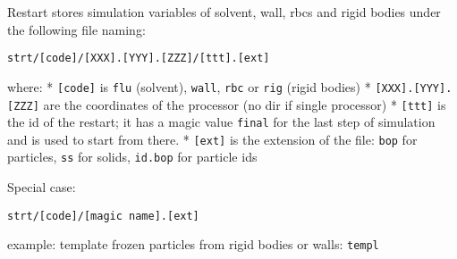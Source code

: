 Restart stores simulation variables of solvent, wall, rbcs and rigid
bodies under the following file naming:

\begin{verbatim}
strt/[code]/[XXX].[YYY].[ZZZ]/[ttt].[ext]
\end{verbatim}

where: * \texttt{{[}code{]}} is \texttt{flu} (solvent), \texttt{wall},
\texttt{rbc} or \texttt{rig} (rigid bodies) *
\texttt{{[}XXX{]}.{[}YYY{]}.{[}ZZZ{]}} are the coordinates of the
processor (no dir if single processor) * \texttt{{[}ttt{]}} is the id of
the restart; it has a magic value \texttt{final} for the last step of
simulation and is used to start from there. * \texttt{{[}ext{]}} is the
extension of the file: \texttt{bop} for particles, \texttt{ss} for
solids, \texttt{id.bop} for particle ids

Special case:

\begin{verbatim}
strt/[code]/[magic name].[ext]
\end{verbatim}

example: template frozen particles from rigid bodies or walls:
\texttt{templ}
